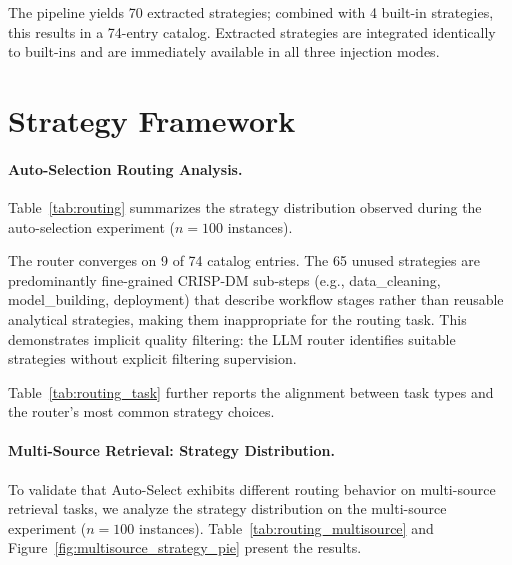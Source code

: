 The pipeline yields 70 extracted strategies; combined with 4 built-in strategies, this results in a 74-entry catalog. Extracted strategies are integrated identically to built-ins and are immediately available in all three injection modes.

\section{Strategy Framework}
\label{app:strategy_framework}
\FloatBarrier

\paragraph{Auto-Selection Routing Analysis.}
\label{app:routing}
Table~\ref{tab:routing} summarizes the strategy distribution observed during the auto-selection experiment ($n=100$ instances).





The router converges on 9 of 74 catalog entries.
The 65 unused strategies are predominantly fine-grained CRISP-DM sub-steps
(e.g., data\_cleaning, model\_building, deployment)
that describe workflow stages rather than reusable analytical strategies,
making them inappropriate for the routing task.
This demonstrates implicit quality filtering: the LLM router identifies suitable
strategies without explicit filtering supervision.



Table~\ref{tab:routing_task} further reports the alignment between task types and the router's most common strategy choices.


\paragraph{Multi-Source Retrieval: Strategy Distribution.}

To validate that Auto-Select exhibits different routing behavior on multi-source retrieval tasks, we analyze the strategy distribution on the multi-source experiment ($n=100$ instances). Table~\ref{tab:routing_multisource} and Figure~\ref{fig:multisource_strategy_pie} present the results.


